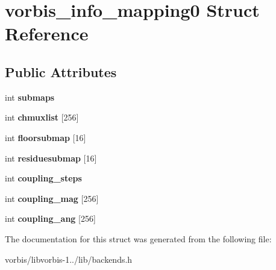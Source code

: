 \hypertarget{structvorbis__info__mapping0}{\section{vorbis\+\_\+info\+\_\+mapping0 Struct Reference}
\label{structvorbis__info__mapping0}
}
\subsection*{Public Attributes}
\begin{DoxyCompactItemize}
\item 
\hypertarget{structvorbis__info__mapping0_ac0b282a3786771686ce023fbd9690d58}{int {\bfseries submaps}}\label{structvorbis__info__mapping0_ac0b282a3786771686ce023fbd9690d58}

\item 
\hypertarget{structvorbis__info__mapping0_a65301b0ac70965455f29baf01503f959}{int {\bfseries chmuxlist} \mbox{[}256\mbox{]}}\label{structvorbis__info__mapping0_a65301b0ac70965455f29baf01503f959}

\item 
\hypertarget{structvorbis__info__mapping0_aae16b72a605d49cbbf4c8b18848e1102}{int {\bfseries floorsubmap} \mbox{[}16\mbox{]}}\label{structvorbis__info__mapping0_aae16b72a605d49cbbf4c8b18848e1102}

\item 
\hypertarget{structvorbis__info__mapping0_a279880bea4274534b86667ad7fc1ae4d}{int {\bfseries residuesubmap} \mbox{[}16\mbox{]}}\label{structvorbis__info__mapping0_a279880bea4274534b86667ad7fc1ae4d}

\item 
\hypertarget{structvorbis__info__mapping0_ab8336109f7ccf188b8fa4b261d92be7f}{int {\bfseries coupling\+\_\+steps}}\label{structvorbis__info__mapping0_ab8336109f7ccf188b8fa4b261d92be7f}

\item 
\hypertarget{structvorbis__info__mapping0_aae668f0f09c4f101de4899e8a1310c8b}{int {\bfseries coupling\+\_\+mag} \mbox{[}256\mbox{]}}\label{structvorbis__info__mapping0_aae668f0f09c4f101de4899e8a1310c8b}

\item 
\hypertarget{structvorbis__info__mapping0_a9a145ee5d8f00b7255461b262fb4e886}{int {\bfseries coupling\+\_\+ang} \mbox{[}256\mbox{]}}\label{structvorbis__info__mapping0_a9a145ee5d8f00b7255461b262fb4e886}

\end{DoxyCompactItemize}


The documentation for this struct was generated from the following file\+:\begin{DoxyCompactItemize}
\item 
vorbis/libvorbis-\/1../lib/backends.\+h\end{DoxyCompactItemize}
